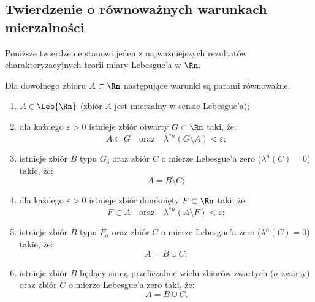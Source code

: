 \subsection{Twierdzenie o równoważnych warunkach mierzalności}

Poniższe twierdzenie stanowi jeden z najważniejszych rezultatów charakteryzacyjnych teorii miary Lebesgue'a w $\Rn$.

\begin{tw}\label{tw:charakter_mierzalnosci}
    Dla dowolnego zbioru $A \subset \Rn$ następujące warunki są parami równoważne:
    \begin{enumerate}
        \item[(1)] $A \in \Leb{\Rn}$ (zbiór $A$ jest mierzalny w sensie Lebesgue'a);
        \item[(2)] dla każdego $\varepsilon > 0$ istnieje zbiór otwarty $G \subset \Rn$ taki, że:
              \begin{equation*}
                  A \subset G \quad \text{oraz} \quad \lambda^{*n}(G \setminus A) < \varepsilon;
              \end{equation*}
        \item[(3)] istnieje zbiór $B$ typu $G_\delta$ oraz zbiór $C$ o mierze Lebesgue'a zero ($\lambda^n(C) = 0$) takie, że:
              \begin{equation*}
                  A = B \setminus C;
              \end{equation*}
        \item[(4)] dla każdego $\varepsilon > 0$ istnieje zbiór domknięty $F \subset \Rn$ taki, że:
              \begin{equation*}
                  F \subset A \quad \text{oraz} \quad \lambda^{*n}(A \setminus F) < \varepsilon;
              \end{equation*}
        \item[(5)] istnieje zbiór $B$ typu $F_\sigma$ oraz zbiór $C$ o mierze Lebesgue'a zero ($\lambda^n(C) = 0$) takie, że:
              \begin{equation*}
                  A = B \cup C;
              \end{equation*}
        \item[(6)] istnieje zbiór $B$ będący sumą przeliczalnie wielu zbiorów zwartych ($\sigma$-zwarty) oraz zbiór $C$ o mierze Lebesgue'a zero taki, że:
              \begin{equation*}
                  A = B \cup C.
              \end{equation*}
    \end{enumerate}
\end{tw}


